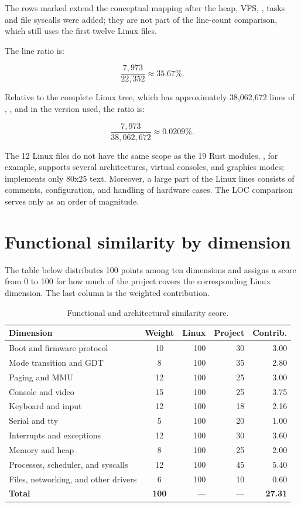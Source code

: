 The rows marked \code{---} extend the conceptual mapping after the heap, VFS,
, tasks and file syscalls were added; they are not part of the
line-count comparison, which still uses the first twelve Linux files.

The line ratio is:

\[
\frac{7{,}973}{22{,}352} \approx 35.67\%.
\]

Relative to the complete Linux tree, which has approximately
38,062,672 lines of , , and  in the version used,
the ratio is:

\[
\frac{7{,}973}{38{,}062{,}672} \approx 0.0209\%.
\]

\begin{atencao}
The 12 Linux files do not have the same scope as the 19 Rust modules.
, for example, supports several architectures, virtual
consoles, and graphics modes;  implements only 80x25 text.
Moreover, a large part of the Linux lines consists of comments,
configuration, and handling of hardware cases. The LOC comparison serves
only as an order of magnitude.
\end{atencao}

\section{Functional similarity by dimension}

The table below distributes 100 points among ten dimensions and assigns a
score from 0 to 100 for how much of the project covers the corresponding
Linux dimension. The last column is the weighted contribution.

\begin{table}[H]
\centering
\caption{Functional and architectural similarity score.}
\label{tab:score}
\begin{tabular}{@{}lcrrr@{}}
\toprule
\textbf{Dimension} & \textbf{Weight} & \textbf{Linux} & \textbf{Project} & \textbf{Contrib.} \\
\midrule
Boot and firmware protocol & 10 & 100 & 30 & 3.00 \\
Mode transition and GDT & 8 & 100 & 35 & 2.80 \\
Paging and MMU & 12 & 100 & 25 & 3.00 \\
Console and video & 15 & 100 & 25 & 3.75 \\
Keyboard and input & 12 & 100 & 18 & 2.16 \\
Serial and tty & 5 & 100 & 20 & 1.00 \\
Interrupts and exceptions & 12 & 100 & 30 & 3.60 \\
Memory and heap & 8 & 100 & 25 & 2.00 \\
Processes, scheduler, and syscalls & 12 & 100 & 45 & 5.40 \\
Files, networking, and other drivers & 6 & 100 & 10 & 0.60 \\
\midrule
\textbf{Total} & \textbf{100} & --- & --- & \textbf{27.31} \\
\bottomrule
\end{tabular}
\end{table}

